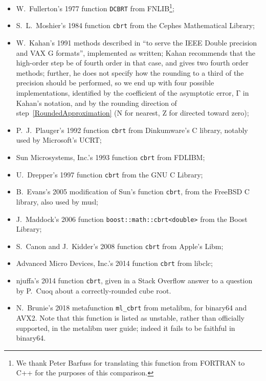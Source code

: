 ﻿\documentclass[10pt, a4paper, twoside]{basestyle}
\begin{document}
\begin{itemize}[nosep]
\item W.~Fullerton's 1977 function \texttt{DCBRT} from FNLIB\footnote{We thank Peter Barfuss for translating this function from FORTRAN to
C++ for the purposes of this comparison.};
\item S.~L.~Moshier's 1984 function \texttt{cbrt} from the Cephes Mathematical Library;
\item W.~Kahan's 1991 methods described in \cite[3]{KahanBindel2001} ``to serve the IEEE Double precision and VAX G formats'',
implemented as written; Kahan recommends that the high-order step be of fourth order in that case, and gives two fourth
order methods; further, he does not specify how the rounding to a third of the precision should be performed,
so we end up with four possible implementations, identified by the coefficient of the asymptotic error,
$\mathrm Γ$ in Kahan's notation, and by the rounding direction of step~\ref{RoundedApproximation}
($\mathrm{N}$ for nearest, $\mathrm{Z}$ for directed toward zero);
\item  P.~J.~Plauger's 1992 function \texttt{cbrt} from Dinkumware's C library, notably used by Microsoft's UCRT;
\item Sun Microsystems, Inc.'s 1993 function \texttt{cbrt} from FDLIBM;
\item U.~Drepper's 1997 function \texttt{cbrt} from the GNU C Library;
\item B.~Evans's 2005 modification of Sun's function \texttt{cbrt}, from the FreeBSD C library, also used by musl;
\item J.~Maddock's 2006 function \texttt{boost::math::cbrt<double>} from the Boost Library;
\item S.~Canon and J.~Kidder's 2008 function \texttt{cbrt} from Apple's Libm;
\item Advanced Micro Devices, Inc.'s 2014 function \texttt{cbrt} from libclc;
\item njuffa's 2014 function \texttt{cbrt}, given in a Stack Overflow answer to a question by P.~Cuoq about a correctly-rounded cube root.
\item N.~Brunie's 2018 metafunction \texttt{ml\_cbrt} from metalibm, for binary64 and AVX2. Note that this function is listed as
unstable, rather than officially supported, in the metalibm user guide; indeed it fails to be faithful in binary64.
\end{itemize}
\end{document}
